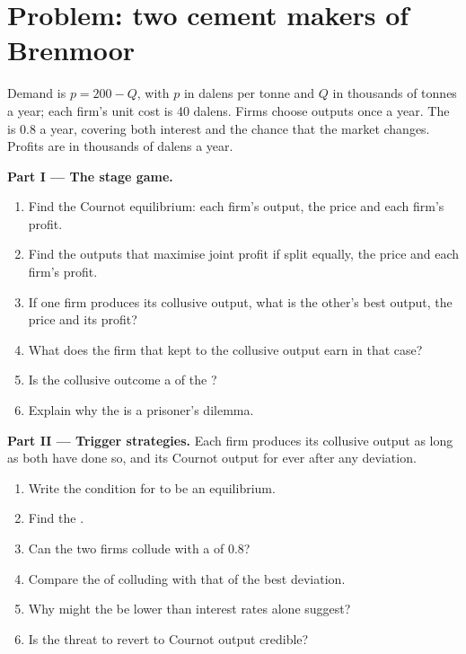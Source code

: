\section{Problem: two cement makers of Brenmoor}\label{sec:b2:repeated-games:problem}

\begin{problem}
\label{pb:b2:repeated-games:1}
Demand is $p = 200 - Q$, with $p$ in dalens per tonne and $Q$ in thousands of tonnes a year; each firm's unit cost is 40 dalens.
Firms choose outputs once a year. The  is 0.8 a year, covering both interest and the chance that the
market changes. Profits are in thousands of dalens a year.

\medskip
\noindent\textbf{Part I --- The stage game.}
\begin{enumerate}
  \item Find the Cournot equilibrium: each firm's output, the price and each firm's profit.
  \item Find the outputs that maximise joint profit if split equally, the price and each firm's profit.
  \item If one firm produces its collusive output, what is the other's best output, the price and its profit?
  \item What does the firm that kept to the collusive output earn in that case?
  \item Is the collusive outcome a  of the ?
  \item Explain why the  is a prisoner's dilemma.
\end{enumerate}

\medskip
\noindent\textbf{Part II --- Trigger strategies.} Each firm produces its collusive output as long as both have done so,
and its Cournot output for ever after any deviation.
\begin{enumerate}[resume]
  \item Write the condition for  to be an equilibrium.
  \item Find the .
  \item Can the two firms collude with a  of 0.8?
  \item Compare the  of colluding with that of the best deviation.
  \item Why might the  be lower than interest rates alone suggest?
  \item Is the threat to revert to Cournot output credible?
\end{enumerate}


\end{problem}
